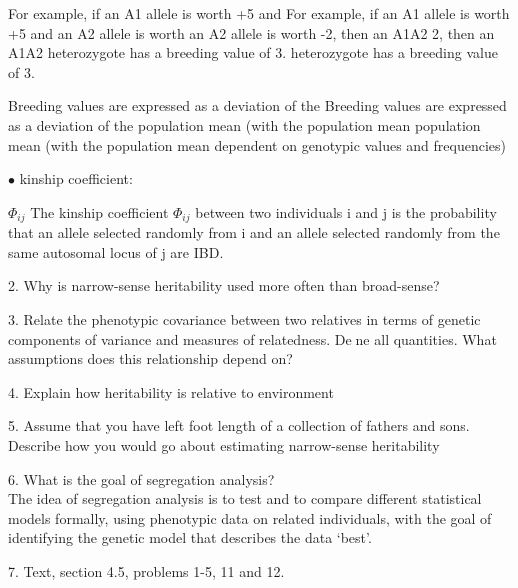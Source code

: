 \documentclass{article}
\begin{document}
For example, if an A1 allele is worth +5 and For example, if an A1 allele is worth +5 and
an A2 allele is worth an A2 allele is worth
-2, then an A1A2 2, then an A1A2
heterozygote has a breeding value of 3. heterozygote has a breeding value of 3.

Breeding values are expressed as a deviation of the Breeding values are expressed as a deviation of the
population mean (with the population mean population mean (with the population mean
dependent on genotypic values and frequencies)


\vspace{1pc}
$\bullet$ kinship coefficient:

	$\Phi_{ij} $ The kinship coefficient $\Phi_{ij} $ between two individuals i and j
	is the probability that an allele selected randomly from i and an allele selected randomly
	from the same autosomal locus of j are IBD.
	
	
\vspace{2pc}
2. Why is narrow-sense heritability used more often than broad-sense?


\vspace{2pc}
3. Relate the phenotypic covariance between two relatives in terms of genetic
components of variance and measures of relatedness. Dene all quantities.
What assumptions does this relationship depend on?


\vspace{2pc}
4. Explain how heritability is relative to environment


\vspace{2pc}
5. Assume that you have left foot length of a collection of fathers and sons.
Describe how you would go about estimating narrow-sense heritability


\vspace{2pc}
6. What is the goal of segregation analysis? \\
The idea of segregation analysis is to test and to compare different statistical models
formally, using phenotypic data on related individuals, with the goal of identifying
the genetic model that describes the data ‘best’.

\vspace{2pc}
7. Text, section 4.5, problems 1-5, 11 and 12.
\end{document}
